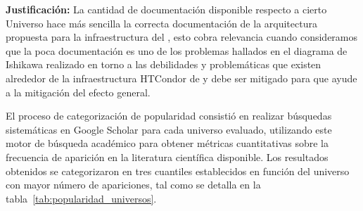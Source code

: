 \textbf{Justificación:} La cantidad de documentación disponible respecto a cierto
Universo hace más sencilla la correcta documentación de la arquitectura
propuesta para la infraestructura del \GRID, esto cobra relevancia cuando
consideramos que la poca documentación es uno de los problemas hallados en
el diagrama de Ishikawa realizado en torno a las debilidades y problemáticas que
existen alrededor de la infraestructura HTCondor de \GRID y debe ser mitigado
para que ayude a la mitigación del efecto general.

El proceso de categorización de popularidad consistió en realizar búsquedas sistemáticas en Google Scholar para cada universo evaluado, utilizando este motor de búsqueda académico para obtener métricas cuantitativas sobre la frecuencia de aparición en la literatura científica disponible. Los resultados obtenidos se categorizaron en tres cuantiles establecidos en función del universo con mayor número de apariciones, tal como se detalla en la tabla~\ref{tab:popularidad_universos}.


